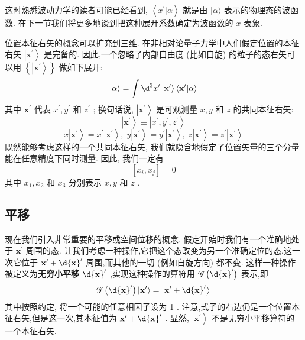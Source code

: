 	这时熟悉波动力学的读者可能已经看到, $\left\langle {{x}^{\prime } | \alpha }\right\rangle$ 就是由 $|\alpha \rangle$ 表示的物理态的波函数. 在下一节我们将更多地谈到把这种展开系数确定为波函数的 $x$ 表象.
	
	位置本征右矢的概念可以扩充到三维. 在非相对论量子力学中人们假定位置的本征右矢 $\left| {\mathbf{x}}^{\prime }\right\rangle$ 是完备的. 因此,一个忽略了内部自由度 (比如自旋) 的粒子的态右矢可以用 $\left\{ \left| {\mathbf{x}}^{\prime }\right\rangle \right\}$ 做如下展开:
	\begin{equation}
		|\alpha \rangle = \int {\d}^{3}{x}^{\prime }\left| {\mathbf{x}}^{\prime }\right\rangle \left\langle {{\mathbf{x}}^{\prime } | \alpha }\right\rangle
	\end{equation}
	其中 ${\mathbf{x}}^{\prime }$ 代表 ${x}^{\prime },{y}^{\prime }$ 和 ${z}^{\prime }$ ; 换句话说, $\left| {\mathbf{x}}^{\prime }\right\rangle$ 是可观测量 $x, y$ 和 $z$ 的共同本征右矢:
	\begin{equation}
		\left| {\mathbf{x}}^{\prime }\right\rangle \equiv \left| {{x}^{\prime },{y}^{\prime },{z}^{\prime }}\right\rangle
	\end{equation}
	\begin{equation}
		x\left| {\mathbf{x}}^{\prime }\right\rangle = {x}^{\prime }\left| {\mathbf{x}}^{\prime }\right\rangle ,\;y\left| {\mathbf{x}}^{\prime }\right\rangle = {y}^{\prime }\left| {\mathbf{x}}^{\prime }\right\rangle ,\;z\left| {\mathbf{x}}^{\prime }\right\rangle = {z}^{\prime }\left| {\mathbf{x}}^{\prime }\right\rangle
	\end{equation}
	既然能够考虑这样的一个共同本征右矢, 我们就隐含地假定了位置矢量的三个分量能在任意精度下同时测量. 因此, 我们一定有
	\begin{equation}
		\left\lbrack {{x}_{i},{x}_{j}}\right\rbrack = 0
	\end{equation}
	其中 ${x}_{1},{x}_{2}$ 和 ${x}_{3}$ 分别表示 $x, y$ 和 $z$ .
	\subsection{平移}
	现在我们引入非常重要的平移或空间位移的概念. 假定开始时我们有一个准确地处于 ${\mathbf{x}}^{\prime }$ 周围的态. 让我们考虑一种操作,它把这个态改变为另一个准确定位的态,这一次它位于 ${\mathbf{x}}^{\prime } + \d{\mathbf{x}}^{\prime }$ 周围,而其他的一切 (例如自旋方向) 都不变. 这样一种操作被定义为\textbf{无穷小平移} $\d{\mathbf{x}}^{\prime }$ ,实现这种操作的算符用 $\mathscr{G}\left( {\d{\mathbf{x}}^{\prime }}\right)$ 表示,即
	\begin{equation}
		\mathscr{G}\left( {\d{\mathbf{x}}^{\prime }}\right) \left| {\mathbf{x}}^{\prime }\right\rangle = \left| {{\mathbf{x}}^{\prime } + \d{\mathbf{x}}^{\prime }}\right\rangle
	\end{equation}
	其中按照约定, 将一个可能的任意相因子设为 1 . 注意,式子的右边仍是一个位置本征右矢,但是这一次,其本征值为 ${\mathbf{x}}^{\prime } + \d{\mathbf{x}}^{\prime }$ . 显然, $\left| {\mathbf{x}}^{\prime }\right\rangle$ 不是无穷小平移算符的一个本征右矢.
	

